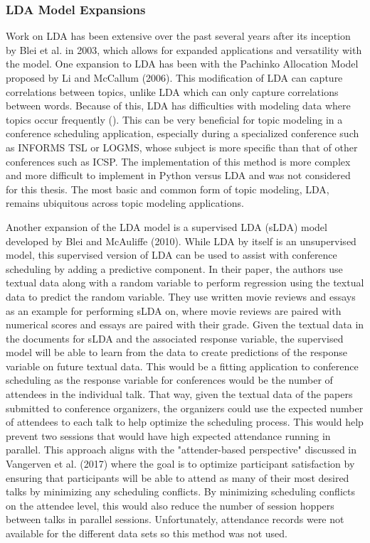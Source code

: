 \documentclass[a4paper, 12pt, twoside]{article}
\numberwithin{equation}{section} %
\begin{document}
\subsubsection{LDA Model Expansions}

Work on LDA has been extensive over the past several years after its inception by Blei et al. in 2003, which allows for expanded applications and versatility with the model. One expansion to LDA has been with the Pachinko Allocation Model proposed by Li and McCallum (2006). This modification of LDA can capture correlations between topics, unlike LDA which can only capture correlations between words. Because of this, LDA has difficulties with modeling data where topics occur frequently (\cite{Li2006}). This can be very beneficial for topic modeling in a conference scheduling application, especially during a specialized conference such as INFORMS TSL or LOGMS, whose subject is more specific than that of other conferences such as ICSP. The implementation of this method is more complex and more difficult to implement in Python versus LDA and was not considered for this thesis. The most basic and common form of topic modeling, LDA, remains ubiquitous across topic modeling applications. 

Another expansion of the LDA model is a supervised LDA (sLDA) model developed by Blei and McAuliffe (2010). While LDA by itself is an unsupervised model, this supervised version of LDA can be used to assist with conference scheduling by adding a predictive component. In their paper, the authors use textual data along with a random variable to perform regression using the textual data to predict the random variable. They use written movie reviews and essays as an example for performing sLDA on, where movie reviews are paired with numerical scores and essays are paired with their grade. Given the textual data in the documents for sLDA and the associated response variable, the supervised model will be able to learn from the data to create predictions of the response variable on future textual data. This would be a fitting application to conference scheduling as the response variable for conferences would be the number of attendees in the individual talk. That way, given the textual data of the papers submitted to conference organizers, the organizers could use the expected number of attendees to each talk to help optimize the scheduling process. This would help prevent two sessions that would have high expected attendance running in parallel. This approach aligns with the "attender-based perspective" discussed in Vangerven et al. (2017) where the goal is to optimize participant satisfaction by ensuring that participants will be able to attend as many of their most desired talks by minimizing any scheduling conflicts. By minimizing scheduling conflicts on the attendee level, this would also reduce the number of session hoppers between talks in parallel sessions. Unfortunately, attendance records were not available for the different data sets so this method was not used.
\end{document}
